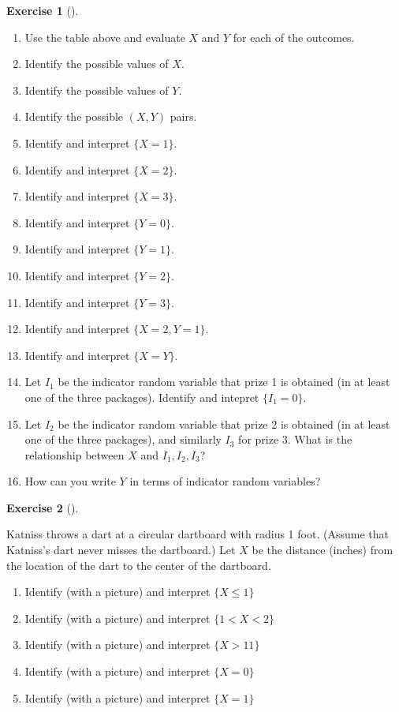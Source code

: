 \documentclass[
  letterpaper,
  DIV=11,
  numbers=noendperiod]{scrreprt}
\providecommand{\tightlist}{%
  \setlength{\itemsep}{0pt}\setlength{\parskip}{0pt}}
\theoremstyle{plain}
\theoremstyle{definition}
\theoremstyle{definition}
\newtheorem{exercise}{Exercise}[chapter]
\theoremstyle{definition}
\theoremstyle{remark}
\begin{document}
\begin{exercise}[]
\begin{enumerate}
\def\labelenumi{\arabic{enumi}.}
\tightlist
\item
  Use the table above and evaluate \(X\) and \(Y\) for each of the
  outcomes.
\item
  Identify the possible values of \(X\).
\item
  Identify the possible values of \(Y\).
\item
  Identify the possible \((X, Y)\) pairs.
\item
  Identify and interpret \(\{X = 1\}\).
\item
  Identify and interpret \(\{X = 2\}\).
\item
  Identify and interpret \(\{X = 3\}\).
\item
  Identify and interpret \(\{Y = 0\}\).
\item
  Identify and interpret \(\{Y = 1\}\).
\item
  Identify and interpret \(\{Y = 2\}\).
\item
  Identify and interpret \(\{Y = 3\}\).
\item
  Identify and interpret \(\{X = 2, Y = 1\}\).
\item
  Identify and interpret \(\{X = Y\}\).
\item
  Let \(I_1\) be the indicator random variable that prize 1 is obtained
  (in at least one of the three packages). Identify and intepret
  \(\{I_1 = 0\}\).
\item
  Let \(I_2\) be the indicator random variable that prize 2 is obtained
  (in at least one of the three packages), and similarly \(I_3\) for
  prize 3. What is the relationship between \(X\) and \(I_1, I_2, I_3\)?
\item
  How can you write \(Y\) in terms of indicator random variables?
\end{enumerate}

\end{exercise}

\begin{exercise}[]\protect\hypertarget{exr-rv-dartboard}{}\label{exr-rv-dartboard}

Katniss throws a dart at a circular dartboard with radius 1 foot.
(Assume that Katniss's dart never misses the dartboard.) Let \(X\) be
the distance (inches) from the location of the dart to the center of the
dartboard.

\begin{enumerate}
\def\labelenumi{\arabic{enumi}.}
\tightlist
\item
  Identify (with a picture) and interpret \(\{X \le 1\}\)
\item
  Identify (with a picture) and interpret \(\{1 < X < 2\}\)
\item
  Identify (with a picture) and interpret \(\{X > 11\}\)
\item
  Identify (with a picture) and interpret \(\{X = 0\}\)
\item
  Identify (with a picture) and interpret \(\{X = 1\}\)
\end{enumerate}

\end{exercise}
\end{document}

